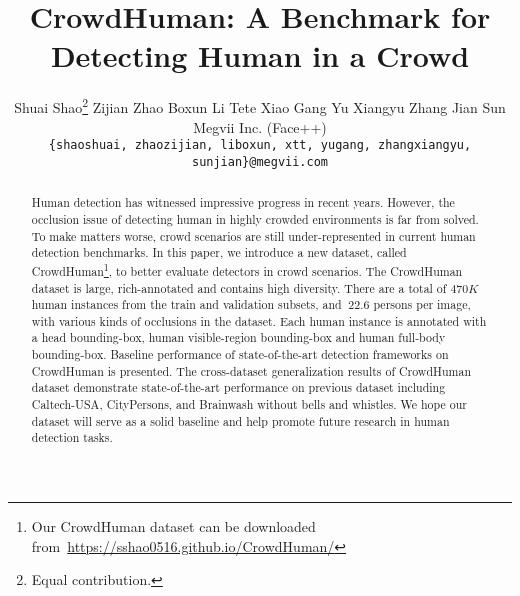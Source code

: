 \documentclass[10pt,twocolumn,letterpaper]{article}
\begin{document}

\title{CrowdHuman: A Benchmark for Detecting Human in a Crowd} %


\author{
    Shuai Shao\thanks{Equal contribution.}
    \hspace{10pt}
    Zijian Zhao\footnotemark[1]
    \hspace{10pt}
    Boxun Li
    \hspace{10pt}
    Tete Xiao
    \hspace{10pt}
    Gang Yu
    \hspace{10pt}
    Xiangyu Zhang
    \hspace{10pt}
    Jian Sun\\
    Megvii Inc. (Face++)\\
{\tt\small \{shaoshuai, zhaozijian, liboxun, xtt, yugang, zhangxiangyu, sunjian\}@megvii.com}
}

\maketitle

\begin{abstract}
Human detection has witnessed impressive progress in recent years. However, the occlusion issue of detecting human in highly crowded environments is far from solved. To make matters worse, crowd scenarios are still under-represented in current human detection benchmarks. In this paper, we introduce a new dataset, called CrowdHuman\footnote{Our CrowdHuman dataset can be downloaded from~\url{https://sshao0516.github.io/CrowdHuman/}}, to better evaluate detectors in crowd scenarios. The CrowdHuman dataset is large, rich-annotated and contains high diversity. There are a total of $470K$ human instances from the train and validation subsets, and $~22.6$ persons per image, with various kinds of occlusions in the dataset. Each human instance is annotated with a head bounding-box, human visible-region bounding-box and human full-body bounding-box. Baseline performance of state-of-the-art detection frameworks on CrowdHuman is presented. The cross-dataset generalization results of CrowdHuman dataset demonstrate state-of-the-art performance on previous dataset including Caltech-USA, CityPersons, and Brainwash without bells and whistles. We hope our dataset will serve as a solid baseline and help promote future research in human detection tasks.
\end{abstract}
\end{document}
